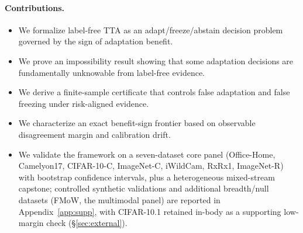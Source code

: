 \documentclass[conference]{IEEEtran}
\theoremstyle{plain}
\theoremstyle{definition}
\begin{document}
\paragraph{Contributions.}
\begin{itemize}
\item We formalize label-free TTA as an adapt/freeze/abstain decision problem governed by the sign of adaptation benefit.
\item We prove an impossibility result showing that some adaptation decisions are fundamentally unknowable from label-free evidence.
\item We derive a finite-sample certificate that controls false adaptation and false freezing under risk-aligned evidence.
\item We characterize an exact benefit-sign frontier based on observable disagreement margin and calibration drift.
\item We validate the framework on a seven-dataset core panel (Office-Home, Camelyon17, CIFAR-10-C, ImageNet-C, iWildCam, RxRx1, ImageNet-R) with bootstrap confidence intervals, plus a heterogeneous mixed-stream capstone; controlled synthetic validations and additional breadth/null datasets (FMoW, the multimodal panel) are reported in Appendix~\ref{app:supp}, with CIFAR-10.1 retained in-body as a supporting low-margin check (\S\ref{sec:external}).
\end{itemize}
\end{document}
